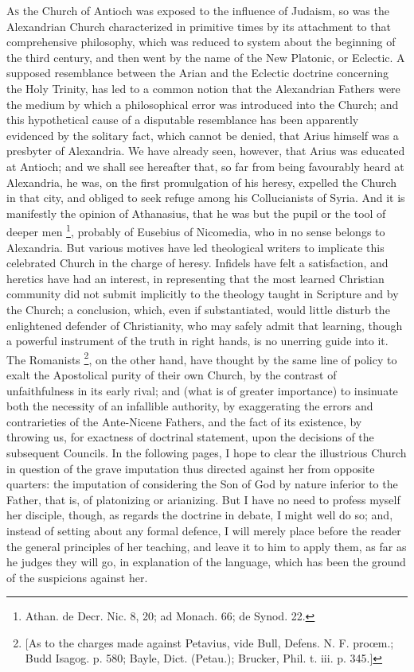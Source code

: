 
A\textsc{s} the Church of Antioch was exposed to the influence of
Judaism, so was the Alexandrian Church characterized in primitive
times by its attachment to that comprehensive philosophy, which was
reduced to system about the beginning of the third century, and then
went by the name of the New Platonic, or Eclectic. A supposed
resemblance between the Arian and the Eclectic doctrine concerning the
Holy Trinity, has led to a common notion that the Alexandrian Fathers
were the medium by which a philosophical error was introduced into the
Church; and this hypothetical cause of a disputable resemblance has
been apparently evidenced by the solitary fact, which cannot be
denied, that Arius himself was a presbyter of Alexandria. We have
already seen, however, that Arius was educated at Antioch; and we
shall see hereafter that, so far from being favourably heard at
Alexandria, he was, on the first promulgation of his heresy, expelled
the Church in that city, and obliged to seek refuge among his
Collucianists of Syria. And it is manifestly the opinion of Athanasius,
that he was but the pupil or the tool of deeper men \footnote{Athan. de Decr. Nic. 8, 20; ad Monach. 66; de Synod. 22.}, probably of Eusebius of Nicomedia, who in no sense
belongs to Alexandria. But various motives have led theological
writers to implicate this celebrated Church in the charge of heresy.
Infidels have felt a satisfaction, and heretics have had an interest,
in representing that the most learned Christian community did not
submit implicitly to the theology taught in Scripture and by the
Church; a conclusion, which, even if substantiated, would little
disturb the enlightened defender of Christianity, who may safely admit
that learning, though a powerful instrument of the truth in right
hands, is no unerring guide into it. The Romanists \footnote{[As to the charges made against Petavius,
vide Bull, Defens. N. F. proœm.; Budd Isagog. p. 580; Bayle, Dict. (Petau.);
Brucker, Phil. t. iii. p. 345.]}, on the other hand, have thought by the same line of policy to
exalt the Apostolical purity of their own Church, by the contrast of
unfaithfulness in its early rival; and (what is of greater importance)
to insinuate both the necessity of an infallible authority, by
exaggerating the errors and contrarieties of the Ante-Nicene Fathers,
and the fact of its existence, by throwing us, for exactness of
doctrinal statement, upon the decisions of the subsequent Councils. In
the following pages, I hope to clear the illustrious Church in
question of the grave imputation thus directed against her from
opposite quarters: the imputation of considering the Son of God by
nature inferior to the Father, that is, of platonizing or arianizing.
But I have no need to profess myself her disciple, though, as regards
the doctrine in debate, I might well do so; and, instead of setting
about any formal defence, I will merely place before the reader the
general principles of her teaching, and leave it to him to apply
them, as far as he judges they will go, in explanation of the
language, which has been the ground of the suspicions against her.

